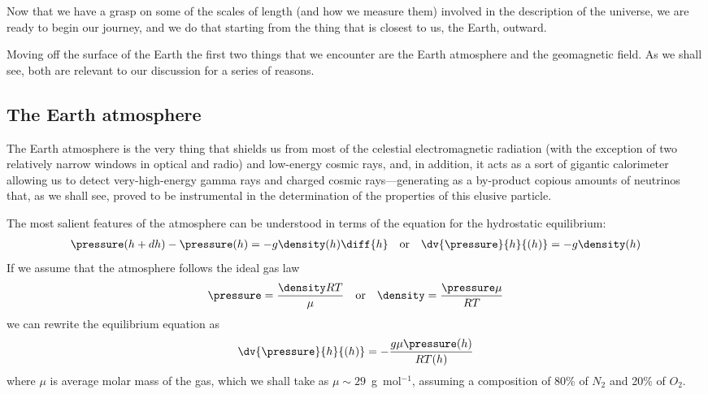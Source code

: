 
Now that we have a grasp on some of the scales of length (and how we measure them)
involved in the description of the universe, we are ready to begin our journey, and
we do that starting from the thing that is closest to us, the Earth, outward.

Moving off the surface of the Earth the first two things that we encounter are the
Earth atmosphere and the geomagnetic field. As we shall see, both are relevant to
our discussion for a series of reasons.



\subsection{The Earth atmosphere}
\label{sec:earth_atmosphere}

The Earth atmosphere is the very thing that shields us from most of the celestial
electromagnetic radiation (with the exception of two relatively narrow windows in
optical and radio) and low-energy cosmic rays, and, in addition, it acts as a sort
of gigantic calorimeter allowing us to detect very-high-energy gamma rays and charged
cosmic rays---generating as a by-product copious amounts of neutrinos that, as we
shall see, proved to be instrumental in the determination of the properties of this
elusive particle.

The most salient features of the atmosphere can be understood in terms of the equation
for the hydrostatic equilibrium:
\begin{align*}
  \pressure(h + dh) - \pressure(h) = -g\density(h) \diff{h}
  \quad\text{or}\quad
  \dv{\pressure}{h}{(h)} = -g\density(h)
\end{align*}
If we assume that the atmosphere follows the ideal gas law
\begin{align*}
  \pressure = \frac{\density RT}{\mu}
  \quad\text{or}\quad
  \density = \frac{\pressure \mu}{RT}
\end{align*}
we can rewrite the equilibrium equation as
\begin{align}\label{eq:atmosphere_hydrostatic_equilibrium}
  \dv{\pressure}{h}{(h)} = - \frac{g\mu \pressure(h)}{RT(h)}
\end{align}
where $\mu$ is average molar mass of the gas, which we shall take as
$\mu \sim 29$~g~mol$^{-1}$, assuming a composition of 80\% of $N_2$ and 20\% of $O_2$.

